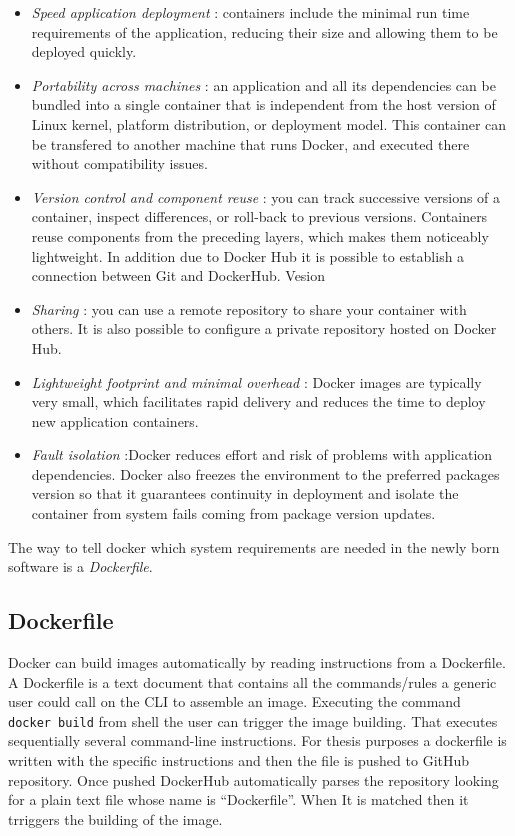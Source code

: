 \documentclass[
  12pt,
  a4paper,
  oneside]{book}
\providecommand{\tightlist}{%
  \setlength{\itemsep}{0pt}\setlength{\parskip}{0pt}}
\theoremstyle{definition}
\theoremstyle{definition}
\theoremstyle{definition}
\theoremstyle{remark}
\begin{document}
\begin{itemize}
\tightlist
\item
  \emph{Speed application deployment} : containers include the minimal run time requirements of the application, reducing their size and allowing them to be deployed quickly.
\item
  \emph{Portability across machines} : an application and all its dependencies can be bundled into a single container that is independent from the host version of Linux kernel, platform distribution, or deployment model. This container can be transfered to another machine that runs Docker, and executed there without compatibility issues.
\item
  \emph{Version control and component reuse} : you can track successive versions of a container, inspect differences, or roll-back to previous versions. Containers reuse components from the preceding layers, which makes them noticeably lightweight. In addition due to Docker Hub it is possible to establish a connection between Git and DockerHub. Vesion
\item
  \emph{Sharing} : you can use a remote repository to share your container with others. It is also possible to configure a private repository hosted on Docker Hub.
\item
  \emph{Lightweight footprint and minimal overhead} : Docker images are typically very small, which facilitates rapid delivery and reduces the time to deploy new application containers.
\item
  \emph{Fault isolation} :Docker reduces effort and risk of problems with application dependencies. Docker also freezes the environment to the preferred packages version so that it guarantees continuity in deployment and isolate the container from system fails coming from package version updates.
\end{itemize}

The way to tell docker which system requirements are needed in the newly born software is a \emph{Dockerfile}.

\hypertarget{dockerfile}{%
\subsection{Dockerfile}\label{dockerfile}}

Docker can build images automatically by reading instructions from a Dockerfile. A Dockerfile is a text document that contains all the commands/rules a generic user could call on the CLI to assemble an image. Executing the command \texttt{docker\ build} from shell the user can trigger the image building. That executes sequentially several command-line instructions. For thesis purposes a dockerfile is written with the specific instructions and then the file is pushed to GitHub repository. Once pushed DockerHub automatically parses the repository looking for a plain text file whose name is ``Dockerfile''. When It is matched then it trriggers the building of the image.
\end{document}

